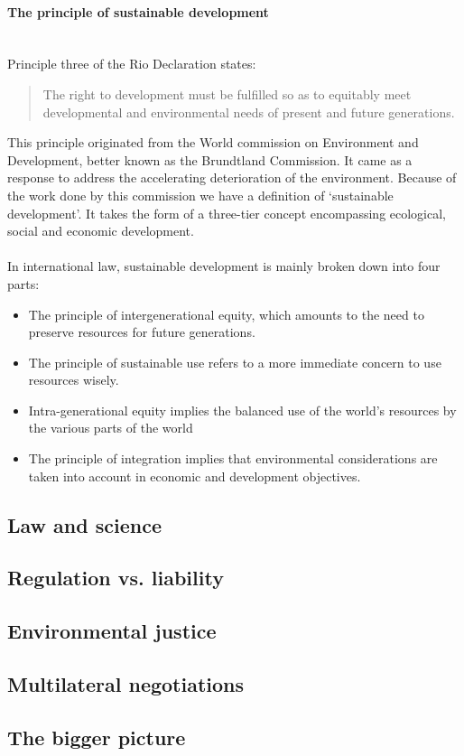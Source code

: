 \documentclass[../summary.tex]{subfiles}
\begin{document}
			\paragraph{The principle of sustainable development}\mbox{}\\
				Principle three of the Rio Declaration states:
				\begin{quote}
					The right to development must be fulfilled so as to equitably meet developmental and environmental needs of present and future generations. 
				\end{quote}
				This principle originated from the World commission on Environment and Development, better known as the Brundtland Commission. It came as a response to address the accelerating deterioration of the environment. Because of the work done by this commission we have a definition of `sustainable development'. It takes the form of a three-tier concept encompassing ecological, social and economic development.\\
				\\
				In international law, sustainable development is mainly broken down into four parts:
				\begin{itemize}
					\item The principle of intergenerational equity, which amounts to the need to preserve resources for future generations. 
					\item The principle of sustainable use refers to a more immediate concern to use resources wisely.
					\item Intra-generational equity implies the balanced use of the world's resources by the various parts of the world
					\item The principle of integration implies that environmental considerations are taken into account in economic and development objectives. 
				\end{itemize}
	
	\subsection{Law and science}
	
	\subsection{Regulation vs. liability}
	
	\subsection{Environmental justice}
	
	\subsection{Multilateral negotiations}
	
	\subsection{The bigger picture}
\end{document}
